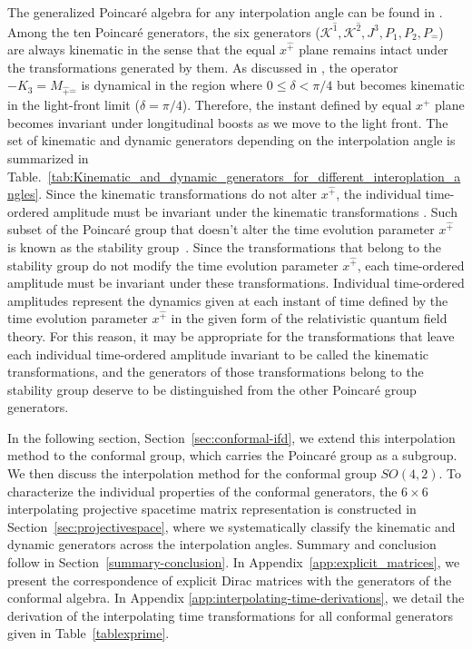 \documentclass[foundations,article,submit,pdftex,moreauthors]{Definitions/mdpi}
\newcommand{\pT}{\hat{+}}
\newcommand{\mT}{\hat{-}}
\newcommand{\itP}[1]{\hat{#1}}
\begin{document}
The generalized Poincar\'e algebra for any interpolation angle can be found in \cite{Ji2001, Ravikumar:2021xck}. 
Among the ten Poincar\'e generators, the six generators ($\mathcal{K}^{\itP{1}}, \mathcal{K}^{\itP{2}}, J^{3}, P_{1}, P_{2}, P_{\mT}$) are always kinematic in the sense that the { equal $x^{\pT}$} plane remains intact under the transformations generated by them.
As discussed in \cite{Ji2001, Ji2012, Ravikumar:2021xck}, the operator $-K_3=M_{\pT\mT}$ is dynamical in the region where $0\leq\delta<\pi/4$ but becomes kinematic in the light-front limit ($\delta=\pi/4$). Therefore, the instant defined by { equal $x^+$ plane} becomes invariant under longitudinal boosts as we move to the light front.
The set of kinematic and dynamic generators depending on the interpolation angle is summarized in Table.~\ref{tab:Kinematic_and_dynamic_generators_for_different_interoplation_angles}.
Since the kinematic transformations do not alter $x^{\pT}$, the individual time-ordered amplitude must be invariant under the kinematic transformations \cite{Ji2018QED}.
{
Such subset of the Poincar\'e group that doesn’t alter the time evolution parameter $x^{\pT}$ is known as the stability group~\cite{LEUTWYLER197894}. Since the transformations that belong to the stability group do not modify the time evolution parameter $x^{\pT}$, each time-ordered amplitude must be invariant under these transformations. Individual time-ordered amplitudes represent the dynamics given at each instant of time defined by the time evolution parameter $x^{\pT}$ in the given form of the relativistic quantum field theory. For this reason, it may be appropriate for the transformations that leave each individual time-ordered amplitude invariant to be called the kinematic transformations, and the generators of those transformations belong to the stability group deserve to be distinguished from the other Poincar\'e group generators. 
}

In the following section, Section~\ref{sec:conformal-ifd}, we extend this interpolation method to the conformal group, which carries the Poincar\'e group as a subgroup. We then discuss the interpolation method for the conformal group $SO(4,2)$. To characterize the individual properties of the conformal generators, the $6\times6$ interpolating projective spacetime matrix representation is constructed in Section~\ref{sec:projectivespace}, where we systematically classify the kinematic and dynamic generators across the interpolation angles. Summary and conclusion follow in Section~\ref{summary-conclusion}.
In Appendix~\ref{app:explicit_matrices}, 
we present the correspondence of explicit Dirac matrices with the generators of the conformal algebra.
In Appendix \ref{app:interpolating-time-derivations}, we detail the derivation of the interpolating time transformations for all conformal generators given in 
Table~\ref{tablexprime}.
\end{document}
